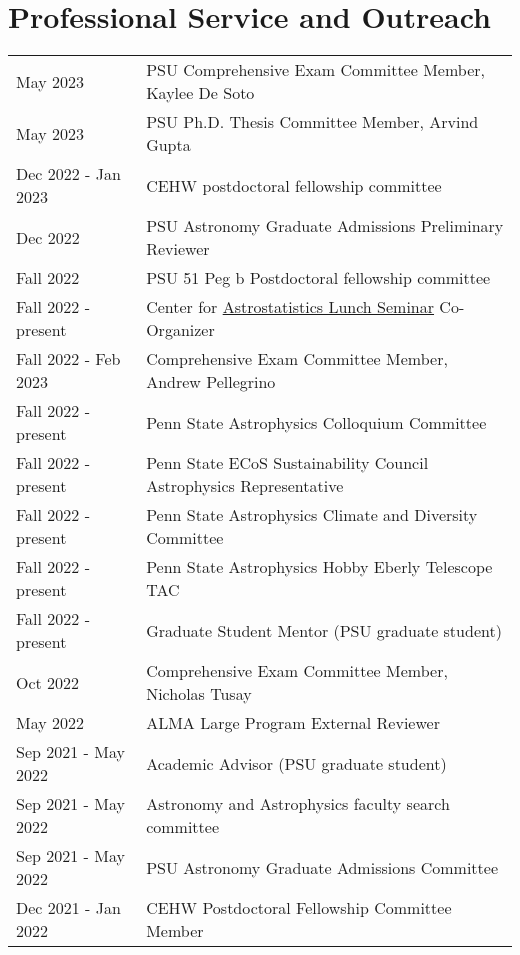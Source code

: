 \section*{Professional Service and Outreach}
\begin{tabular*}{\textwidth}{@{\hspace{10pt}}p{1.4in}l}
May 2023 & PSU Comprehensive Exam Committee Member, Kaylee De Soto \\    
May 2023 & PSU Ph.D. Thesis Committee Member, Arvind Gupta\\
Dec 2022 - Jan 2023 & CEHW postdoctoral fellowship committee \\
Dec 2022 & PSU Astronomy Graduate Admissions Preliminary Reviewer \\
Fall 2022 & PSU 51 Peg b Postdoctoral fellowship committee \\
Fall 2022 - present & Center for \href{https://sites.psu.edu/astrostatistics/cast-lunch-meetings/}{Astrostatistics Lunch Seminar} Co-Organizer \\
Fall 2022 - Feb 2023 & Comprehensive Exam Committee Member, Andrew Pellegrino \\    
Fall 2022 - present & Penn State Astrophysics Colloquium Committee \\
Fall 2022 - present & Penn State ECoS Sustainability Council Astrophysics Representative \\
Fall 2022 - present & Penn State Astrophysics Climate and Diversity Committee \\
Fall 2022 - present & Penn State Astrophysics Hobby Eberly Telescope TAC \\
Fall 2022 - present & Graduate Student Mentor (PSU graduate student) \\ %
Oct 2022 & Comprehensive Exam Committee Member, Nicholas Tusay \\
May 2022 & ALMA Large Program External Reviewer \\
Sep 2021 - May 2022 & Academic Advisor (PSU graduate student) \\ %
Sep 2021 - May 2022 & Astronomy and Astrophysics faculty search committee\\
Sep 2021 - May 2022 & PSU Astronomy Graduate Admissions Committee \\ 
Dec 2021 - Jan 2022 & CEHW Postdoctoral Fellowship Committee Member \\

\end{tabular*}
